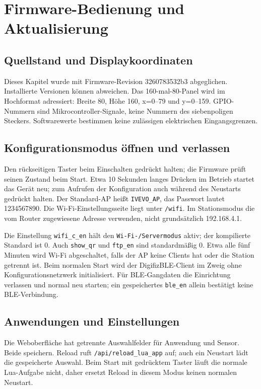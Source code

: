 \chapter{Firmware-Bedienung und Aktualisierung}\label{ch:firmware}
\section{Quellstand und Displaykoordinaten}
Dieses Kapitel wurde mit Firmware-Revision 3260783532b3 abgeglichen. Installierte Versionen können abweichen. Das 160-mal-80-Panel wird im Hochformat adressiert: Breite 80, Höhe 160, x=0–79 und y=0–159. GPIO-Nummern sind Mikrocontroller-Signale, keine Nummern des siebenpoligen Steckers. Softwarewerte bestimmen keine zulässigen elektrischen Eingangsgrenzen.

\section{Konfigurationsmodus öffnen und verlassen}
Den rückseitigen Taster beim Einschalten gedrückt halten; die Firmware prüft seinen Zustand beim Start. Etwa 10 Sekunden langes Drücken im Betrieb startet das Gerät neu; zum Aufrufen der Konfiguration auch während des Neustarts gedrückt halten. Der Standard-AP heißt \nolinkurl{IVEVO_AP}, das Passwort lautet 1234567890. Die Wi-Fi-Einstellungsseite liegt unter \nolinkurl{/wifi}. Im Stationsmodus die vom Router zugewiesene Adresse verwenden, nicht grundsätzlich 192.168.4.1.

Die Einstellung \nolinkurl{wifi_c_en} hält den \nolinkurl{Wi-Fi-/Servermodus} aktiv; der kompilierte Standard ist 0. Auch \nolinkurl{show_qr} und \nolinkurl{ftp_en} sind standardmäßig 0. Etwa alle fünf Minuten wird Wi-Fi abgeschaltet, falls der AP keine Clients hat oder die Station getrennt ist. Beim normalen Start wird der DigifizBLE-Client im Zweig ohne Konfigurationsnetzwerk initialisiert. Für BLE-Gangdaten die Einrichtung verlassen und normal neu starten; ein gespeichertes \nolinkurl{ble_en} allein bestätigt keine BLE-Verbindung.

\section{Anwendungen und Einstellungen}
Die Weboberfläche hat getrennte Auswahlfelder für Anwendung und Sensor. Beide speichern. Reload ruft \nolinkurl{/api/reload_lua_app} auf; auch ein Neustart lädt die gespeicherte Auswahl. Beim Start mit gedrücktem Taster läuft die normale Lua-Aufgabe nicht, daher ersetzt Reload in diesem Modus keinen normalen Neustart.

